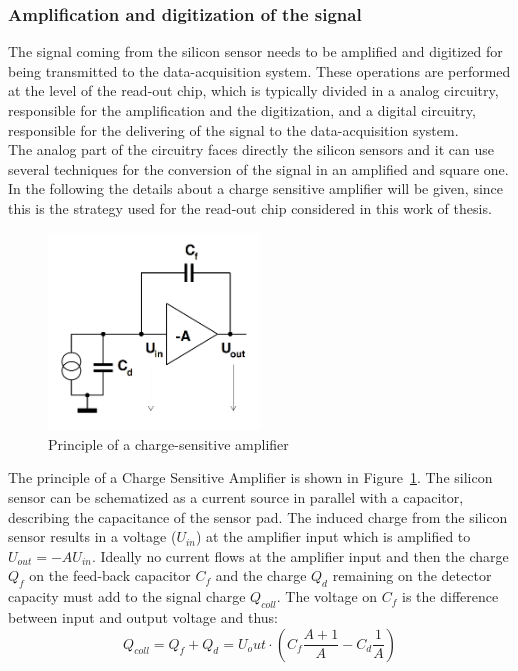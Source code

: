 \subsubsection{Amplification and digitization of the signal}
The signal coming from the silicon sensor needs to be amplified and digitized for being transmitted to the data-acquisition system. These operations are performed at the level of the read-out chip, which is typically divided in a analog circuitry, responsible for the amplification and the digitization, and a digital circuitry, responsible for the delivering of the signal to the data-acquisition system.\\
The analog part of the circuitry faces directly the silicon sensors and it can use several techniques for the conversion of the signal in an amplified and square one. In the following the details about a charge sensitive amplifier will be given, since this is the strategy used for the read-out chip considered in this work of thesis.\\
\begin{figure}
\centering
\includegraphics[width=0.5\textwidth]{Images/tracking_det/ChargeSensitiveAmplifier.png}
\caption{Principle of a charge-sensitive amplifier}
\label{pic:amp}
\end{figure}
The principle of a Charge Sensitive Amplifier is shown in Figure~\ref{pic:amp}. The silicon sensor can be schematized as a current source in parallel with a capacitor, describing the capacitance of the sensor pad. The induced charge from the silicon sensor results in a voltage ($U_{in}$) at the amplifier input which is amplified to $U_{out}=-A U_{in}$. Ideally no current flows at the amplifier input and then the charge $Q_f$ on the feed-back capacitor $C_f$ and the charge $Q_d$ remaining on the detector capacity must add to the signal charge $Q_{coll}$. The voltage on $C_f$ is the difference between input and output voltage and thus:
\begin{equation}
Q_{coll} = Q_f + Q_d = U_out \cdot( C_f\frac{A+1}{A}-C_d\frac{1}{A})
\end{equation}
